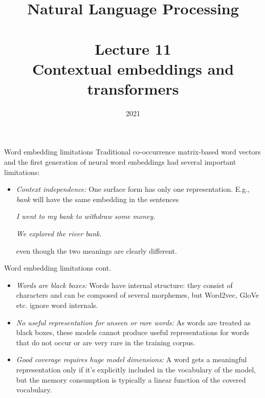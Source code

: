 \documentclass[style=upen, size=14pt]{powerdot}
\newcommand{\gold}{\color{arany}}
\theoremstyle{definition}
\begin{document}
\title{Natural Language Processing\\~~\\Lecture 11\\Contextual embeddings and
  transformers}

\date{2021}
\maketitle

\begin{slide}[toc=Embedding limitations]{Word embedding limitations}
  Traditional co-occurrence matrix-based word vectors and the first generation
  of neural word embeddings had several important limitations:
  \begin{itemize}
  \item \emph{\gold Context independence:} One surface form has only one
    representation. E.g., \emph{bank} will have the same embedding in the
    sentences\medskip

    \emph{I went to my bank to withdraw some money.}\medskip


    \emph{We explored the river bank.}\medskip

    even though the two meanings are clearly different.
  \end{itemize}
\end{slide}

\begin{slide}[toc=]{Word embedding limitations cont.}
  \begin{itemize}
  \item \emph{\gold Words are black boxes:} Words have internal structure: they
    consist of characters and can be composed of several morphemes, but
    Word2vec, GloVe etc. ignore word internals.
  \item \emph{\gold No useful representation for unseen or rare words:} As words
    are treated as black boxes, these models cannot produce useful
    representations for words that do not occur or are very rare in the training
    corpus.
  \item \emph{\gold Good coverage requires huge model dimensions:} A word gets a
    meaningful representation only if it's explicitly included in the vocabulary
    of the model, but the memory consumption is typically a linear function of
    the covered vocabulary.
  \end{itemize}
\end{slide}
\end{document}
